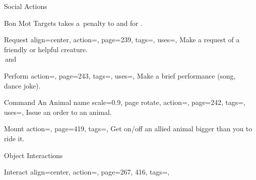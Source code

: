 \begin{PageBack}
\begin{Tables}{\backTableHeight}
\begin{Table}{Social Actions}
\begin{entry}{Bon Mot}
                Targets takes a \,\Status penalty to \PerceptionT and \WillT {} for .
                \hfill {}
            \end{entry}
            \breakLine
            \begin{entry}{Request}{%
                align=center,
                action=,
                page=239,
                tags=\Concentrate\Mental,
                uses=\Diplomacy,
            }
                Make a request of a friendly or helpful creature.\hfill {}\\
                \Auditory\,and \Linguistic\hfill{}\quad {}
            \end{entry}
            \begin{entry}{Perform}{%
                action=,
                page=243,
                tags=\Concentrate,
                uses=\Performance,
            }
                Make a brief performance (song, dance joke).\hfill{}\quad {}
            \end{entry}
            \breakLine
            \begin{entry}{Command An Animal}{%
                name scale=0.9,
                page rotate,
                action=\!,
                page=242,
                tags=\Concentrate,
                uses=\NatureWill,
            }
                Issue an order to an animal. \Auditory\hfill {}
            \end{entry}
            \begin{entry}{Mount}{%
                action=,
                page=419,
                tags=\Move,
            }
                Get on/off an allied animal bigger than you to ride it.
            \end{entry}
        \end{Table}%
        \TableSpace
        \begin{Table}{Object Interactions}
            \begin{entry}{Interact}{%
                align=center,
                action=,
                page={267, 416},
                tags=\Manipulate,
            }%
                \renewcommand{\arraystretch}{1}%
                \setlength{\tabcolsep}{6pt}%
                \begin{tabularx}{\linewidth}{@{}lll}%

\end{tabularx}
\end{entry}
\end{Table}
\end{Tables}
\end{PageBack}
